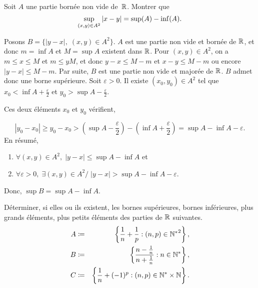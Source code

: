 \documentclass{magnolia}
\begin{document}
Soit $A$ une partie bornée non vide de~$\mathbb{R}$. Montrer que 
\[\sup_{\left(x,y\right)\in A^2}\left|x-y\right|=\sup(A)-\inf(A).\]

\begin{sol}
Posons $B=\{|y-x|,\;(x,y)\in A^2\}$.
$A$ est une partie non vide et bornée de $\mathbb{R}$, et donc $m=\inf A$ et $M=\sup A$ existent dans $\mathbb{R}$.
Pour $(x,y)\in A^2$, on a $m\leq x\leq M$ et $m\leq y M$, et donc $y-x\leq M-m$ et $x-y\leq M-m$ ou encore $|y-x|\leq M-m$.
Par suite, $B$ est une partie non vide et majorée de $\mathbb{R}$. $B$ admet donc une borne supérieure.
Soit $\varepsilon>0$. Il existe $(x_0,y_0)\in A^2$ tel que $x_0<\inf A+\frac{\varepsilon}{2}$ et $y_0>\sup A-\frac{\varepsilon}{2}$.

Ces deux éléments $x_0$ et $y_0$ vérifient, 

$$|y_0-x_0|\geq y_0-x_0>\left(\sup A-\frac{\varepsilon}{2}\right)-\left(\inf A+\frac{\varepsilon}{2}\right)=\sup A-\inf A-\varepsilon.$$
En résumé, 
\begin{enumerate}
 \item  $\forall(x,y)\in A^2,\;|y-x|\leq\sup A-\inf A$ et  
 \item  $\forall\varepsilon>0,\;\exists(x,y)\in A^2/\;|y-x|>\sup A-\inf A-\varepsilon$.
\end{enumerate}
Donc, $\sup B=\sup A-\inf A$.

\end{sol}


Déterminer, si
elles ou ils existent, les bornes supérieures, bornes inférieures, plus grands
éléments, plus petits éléments des parties de $\mathbb{R}$ suivantes.
\begin{eqnarray*}
A&\coloneqq&\left\{\frac{1}{n}+\frac{1}{p} : \left(n,p\right)\in{\mathbb{N}^*}^2\right\},\\
B&\coloneqq&\left\{\frac{n-\frac{1}{n}}{n+\frac{1}{n}} : n\in{\mathbb{N}^*}\right\},\\
C&\coloneqq&\left\{\frac{1}{n}+(-1)^p : \left(n,p\right)\in{\mathbb{N}^*}\times\mathbb{N}\right\}.
\end{eqnarray*}
\end{document}

